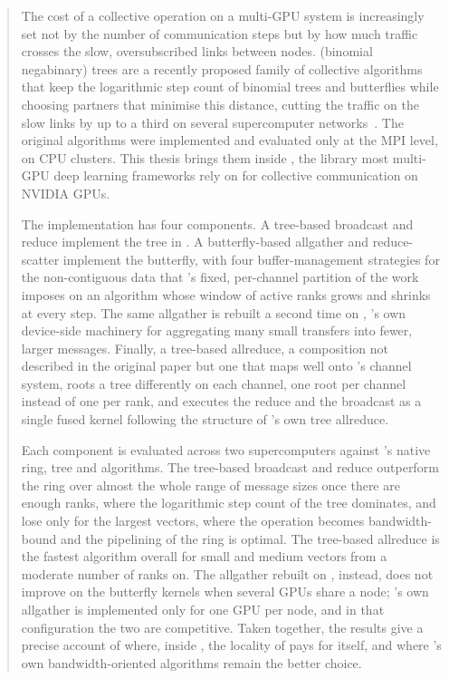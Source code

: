 \begin{abstract}
The cost of a collective operation on a multi-GPU system is increasingly set not by the number of communication steps but by how much traffic crosses the slow, oversubscribed links between nodes.
\bine{} (binomial negabinary) trees are a recently proposed family of collective algorithms that keep the logarithmic step count of binomial trees and butterflies while choosing partners that minimise this distance, cutting the traffic on the slow links by up to a third on several supercomputer networks~\cite{desensi2025bine}.
The original algorithms were implemented and evaluated only at the MPI level, on CPU clusters. This thesis brings them inside \nccl{}, the library most multi-GPU deep learning frameworks rely on for collective communication on NVIDIA GPUs.

The implementation has four components.
A tree-based broadcast and reduce implement the \bine{} tree in \nccl{}.
A butterfly-based allgather and reduce-scatter implement the \bine{} butterfly, with four buffer-management strategies for the non-contiguous data that \nccl{}'s fixed, per-channel partition of the work imposes on an algorithm whose window of active ranks grows and shrinks at every step.
The same allgather is rebuilt a second time on \pat{}, \nccl{}'s own device-side machinery for aggregating many small transfers into fewer, larger messages.
Finally, a tree-based allreduce, a composition not described in the original \bine{} paper but one that maps well onto \nccl{}'s channel system, roots a \bine{} tree differently on each channel, one root per channel instead of one per rank, and executes the reduce and the broadcast as a single fused kernel following the structure of \nccl{}'s own tree allreduce.

Each component is evaluated across two supercomputers against \nccl{}'s native ring, tree and \pat{} algorithms.
The tree-based broadcast and reduce outperform the ring over almost the whole range of message sizes once there are enough ranks, where the logarithmic step count of the tree dominates, and lose only for the largest vectors, where the operation becomes bandwidth-bound and the pipelining of the ring is optimal.
The tree-based allreduce is the fastest algorithm overall for small and medium vectors from a moderate number of ranks on.
The allgather rebuilt on \pat{}, instead, does not improve on the butterfly kernels when several GPUs share a node; \nccl{}'s own \pat{} allgather is implemented only for one GPU per node, and in that configuration the two are competitive.
Taken together, the results give a precise account of where, inside \nccl{}, the locality of \bine{} pays for itself, and where \nccl{}'s own bandwidth-oriented algorithms remain the better choice.
\end{abstract}
